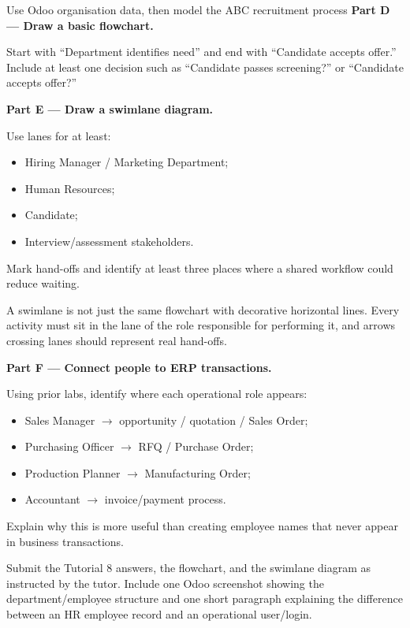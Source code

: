 \begin{labproject}{Use Odoo organisation data, then model the ABC recruitment process}
\medskip\noindent\textbf{Part D --- Draw a basic flowchart.}

Start with ``Department identifies need'' and end with ``Candidate accepts offer.'' Include at least one decision such as ``Candidate passes screening?'' or ``Candidate accepts offer?''

\medskip\noindent\textbf{Part E --- Draw a swimlane diagram.}

Use lanes for at least:
\begin{itemize}
  \item Hiring Manager / Marketing Department;
  \item Human Resources;
  \item Candidate;
  \item Interview/assessment stakeholders.
\end{itemize}

Mark hand-offs and identify at least three places where a shared workflow could reduce waiting.

\begin{pitfall}
A swimlane is not just the same flowchart with decorative horizontal lines. Every activity must sit in the lane of the role responsible for performing it, and arrows crossing lanes should represent real hand-offs.
\end{pitfall}

\medskip\noindent\textbf{Part F --- Connect people to ERP transactions.}

Using prior labs, identify where each operational role appears:
\begin{itemize}
  \item Sales Manager $\rightarrow$ opportunity / quotation / Sales Order;
  \item Purchasing Officer $\rightarrow$ RFQ / Purchase Order;
  \item Production Planner $\rightarrow$ Manufacturing Order;
  \item Accountant $\rightarrow$ invoice/payment process.
\end{itemize}

Explain why this is more useful than creating employee names that never appear in business transactions.
\end{labproject}

\begin{labdeliverable}
Submit the Tutorial 8 answers, the flowchart, and the swimlane diagram as instructed by the tutor. Include one Odoo screenshot showing the department/employee structure and one short paragraph explaining the difference between an HR employee record and an operational user/login.
\end{labdeliverable}
